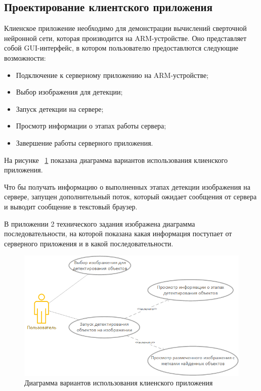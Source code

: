 \documentclass[a4paper,english,russian]{G2-105}
\begin{document}
\subsection{Проектирование клиентского приложения}
\par Клиенское приложение необходимо для демонстрации вычислений сверточной нейронной сети, которая производится на ARM-устройстве. Оно представляет собой GUI-интерфейс, в котором пользователю предоставлются следующие возможности:
\begin{itemize}
\item Подключение к серверному приложению на ARM-устройстве;
\item Выбор изображения для детекции;
\item Запуск детекции на сервере;
\item Просмотр информации о этапах работы сервера;
\item Завершение работы серверного приложения.
\end{itemize}
\par На рисунке ~\ref{usecase} показана диаграмма вариантов использования клиенского приложения.
\par Что бы получать информацию о выполненных этапах детекции изображения на сервере, запущен дополнительный поток, который ожидает сообщения от сервера и выводит сообщение в текстовый браузер. 
\par В приложении 2 технического задания изображена диаграмма последовательности, на которой показана какая информация поступает от серверного приложения и в какой последовательности. 
\begin{figure}
    \includegraphics[scale = 0.7]{usecaseclient.png}
    \caption{Диаграмма вариантов использования клиенского приложения}
	\label{usecase}
\end{figure}
\ttl
\end{document}

